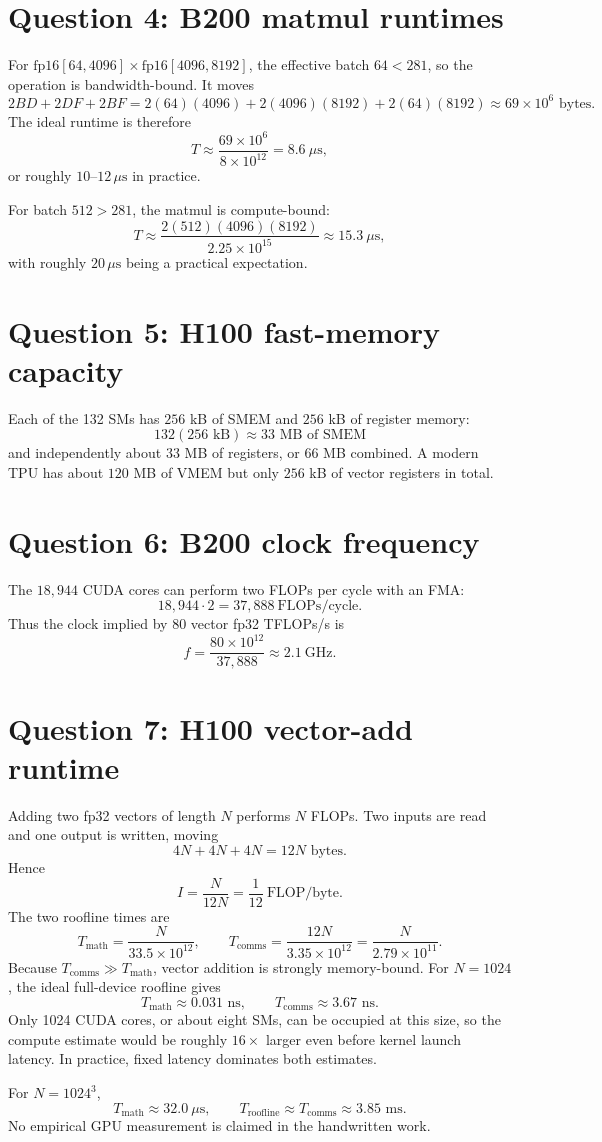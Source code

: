 \documentclass[11pt]{article}
\begin{document}
\section*{Question 4: B200 matmul runtimes}

For
\(\mathrm{fp16}[64,4096]\times\mathrm{fp16}[4096,8192]\),
the effective batch \(64<281\), so the operation is bandwidth-bound.  It
moves
\[
2BD+2DF+2BF
=2(64)(4096)+2(4096)(8192)+2(64)(8192)
\approx69\times10^6\text{ bytes}.
\]
The ideal runtime is therefore
\[
\boxed{T\approx\frac{69\times10^6}{8\times10^{12}}
=8.6\ \mu\mathrm{s}},
\]
or roughly \(10\)--\(12\,\mu\mathrm{s}\) in practice.

For batch \(512>281\), the matmul is compute-bound:
\[
\boxed{
T\approx
\frac{2(512)(4096)(8192)}{2.25\times10^{15}}
\approx15.3\ \mu\mathrm{s}},
\]
with roughly \(20\,\mu\mathrm{s}\) being a practical expectation.

\section*{Question 5: H100 fast-memory capacity}

Each of the 132 SMs has \(256\) kB of SMEM and \(256\) kB of register
memory:
\[
132(256\text{ kB})\approx\boxed{33\text{ MB of SMEM}}
\]
and independently about \(33\) MB of registers, or \(66\) MB combined.
A modern TPU has about \(120\) MB of VMEM but only \(256\) kB of vector
registers in total.

\section*{Question 6: B200 clock frequency}

The \(18{,}944\) CUDA cores can perform two FLOPs per cycle with an FMA:
\[
18{,}944\cdot2=37{,}888\ \text{FLOPs/cycle}.
\]
Thus the clock implied by \(80\) vector fp32 TFLOPs/s is
\[
\boxed{
f=\frac{80\times10^{12}}{37{,}888}
\approx2.1\ \text{GHz}.}
\]

\section*{Question 7: H100 vector-add runtime}

Adding two fp32 vectors of length \(N\) performs \(N\) FLOPs.  Two inputs
are read and one output is written, moving
\[
4N+4N+4N=12N\text{ bytes}.
\]
Hence
\[
\boxed{I=\frac{N}{12N}=\frac1{12}\ \text{FLOP/byte}.}
\]
The two roofline times are
\[
T_{\mathrm{math}}=\frac{N}{33.5\times10^{12}},
\qquad
T_{\mathrm{comms}}=\frac{12N}{3.35\times10^{12}}
=\frac{N}{2.79\times10^{11}}.
\]
Because \(T_{\mathrm{comms}}\gg T_{\mathrm{math}}\), vector addition is
strongly memory-bound.  For \(N=1024\), the ideal full-device roofline gives
\[
T_{\mathrm{math}}\approx0.031\text{ ns},
\qquad
T_{\mathrm{comms}}\approx3.67\text{ ns}.
\]
Only 1024 CUDA cores, or about eight SMs, can be occupied at this size, so
the compute estimate would be roughly \(16\times\) larger even before kernel
launch latency.  In practice, fixed latency dominates both estimates.

For \(N=1024^3\),
\[
T_{\mathrm{math}}\approx32.0\ \mu\mathrm{s},
\qquad
\boxed{T_{\mathrm{roofline}}\approx T_{\mathrm{comms}}
\approx3.85\text{ ms}.}
\]
No empirical GPU measurement is claimed in the handwritten work.
\end{document}
